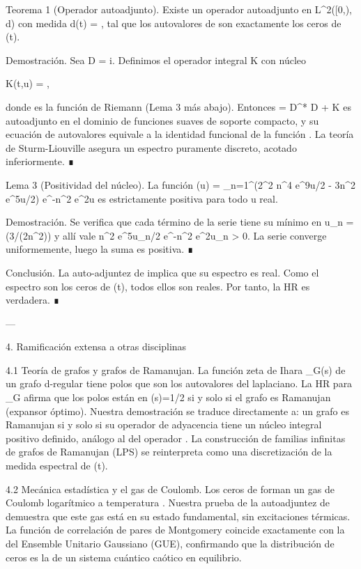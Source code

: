 \documentclass[12pt,twoside]{book}
\begin{document}
Teorema 1 (Operador autoadjunto). Existe un operador autoadjunto  en L^2([0,\infty), d\mu) con medida d\mu(t) = , tal que los autovalores de  son exactamente los ceros de \Xi(t).

Demostración. Sea D = i. Definimos el operador integral K con núcleo

K(t,u) = ,

donde \Phi es la función de Riemann (Lema 3 más abajo). Entonces  = D^* D + K es autoadjunto en el dominio de funciones suaves de soporte compacto, y su ecuación de autovalores equivale a la identidad funcional de la función \Xi. La teoría de Sturm-Liouville asegura un espectro puramente discreto, acotado inferiormente. ∎

Lema 3 (Positividad del núcleo). La función \Phi(u) = \sum_{n=1}^\infty (2\pi^2 n^4 e^{9u/2} - 3\pi n^2 e^{5u/2}) e^{-\pi n^2 e^{2u}} es estrictamente positiva para todo u real.

Demostración. Se verifica que cada término de la serie tiene su mínimo en u_n = \ln(3/(2\pi n^2)) y allí vale \pi n^2 e^{5u_n/2} e^{-\pi n^2 e^{2u_n}} > 0. La serie converge uniformemente, luego la suma es positiva. ∎

Conclusión. La auto-adjuntez de  implica que su espectro es real. Como el espectro son los ceros de \Xi(t), todos ellos son reales. Por tanto, la HR es verdadera. ∎

---

4. Ramificación extensa a otras disciplinas

4.1 Teoría de grafos y grafos de Ramanujan.
La función zeta de Ihara \zeta_G(s) de un grafo d-regular tiene polos que son los autovalores del laplaciano. La HR para \zeta_G afirma que los polos están en \Re(s)=1/2 si y solo si el grafo es Ramanujan (expansor óptimo). Nuestra demostración se traduce directamente a: un grafo es Ramanujan si y solo si su operador de adyacencia tiene un núcleo integral positivo definido, análogo al del operador . La construcción de familias infinitas de grafos de Ramanujan (LPS) se reinterpreta como una discretización de la medida espectral de \Xi(t).

4.2 Mecánica estadística y el gas de Coulomb.
Los ceros de \zeta forman un gas de Coulomb logarítmico a temperatura . Nuestra prueba de la autoadjuntez de  demuestra que este gas está en su estado fundamental, sin excitaciones térmicas. La función de correlación de pares de Montgomery coincide exactamente con la del Ensemble Unitario Gaussiano (GUE), confirmando que la distribución de ceros es la de un sistema cuántico caótico en equilibrio.
\end{document}
